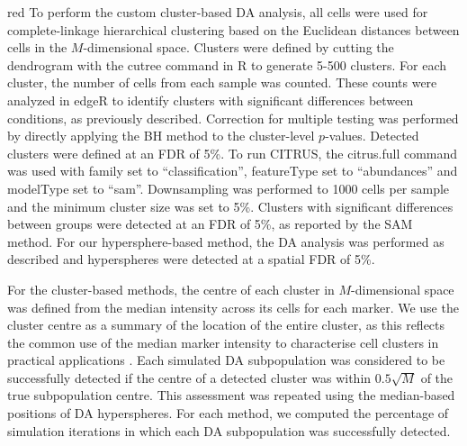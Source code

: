\documentclass{article}
\begin{document}
\begin{color}{red}
To perform the custom cluster-based DA analysis, all cells were used for complete-linkage hierarchical clustering based on the Euclidean distances between cells in the $M$-dimensional space.
Clusters were defined by cutting the dendrogram with the cutree command in R to generate 5-500 clusters.
For each cluster, the number of cells from each sample was counted.
These counts were analyzed in edgeR to identify clusters with significant differences between conditions, as previously described.
Correction for multiple testing was performed by directly applying the BH method to the cluster-level $p$-values.
Detected clusters were defined at an FDR of 5\%.
To run CITRUS, the citrus.full command was used with family set to ``classification'', featureType set to ``abundances'' and modelType set to ``sam''.
Downsampling was performed to 1000 cells per sample and the minimum cluster size was set to 5\%.
Clusters with significant differences between groups were detected at an FDR of 5\%, as reported by the SAM method.
For our hypersphere-based method, the DA analysis was performed as described and hyperspheres were detected at a spatial FDR of 5\%.


For the cluster-based methods, the centre of each cluster in $M$-dimensional space was defined from the median intensity across its cells for each marker.
We use the cluster centre as a summary of the location of the entire cluster, as this reflects the common use of the median marker intensity to characterise cell clusters in practical applications \cite{qiu2011extracting,bruggner2014automated}.
Each simulated DA subpopulation was considered to be successfully detected if the centre of a detected cluster was within $0.5\sqrt{M}$ of the true subpopulation centre.
This assessment was repeated using the median-based positions of DA hyperspheres.
For each method, we computed the percentage of simulation iterations in which each DA subpopulation was successfully detected.


\end{color}
\end{document}
